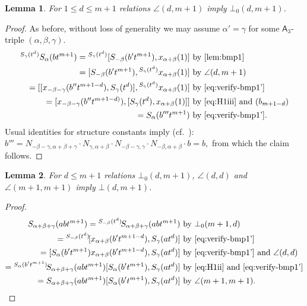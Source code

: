 \documentclass[oneside, 10pt]{amsart}
\numberwithin{equation}{section}
\newtheorem{lemma}{Lemma}
\numberwithin{lemma}{section}
\theoremstyle{definition}
\theoremstyle{remark}
\begin{document}
\begin{lemma} \label{claim2} For $1\leq d\leq m+1$ relations $\angle(d, m+1)$ imply $\bot_0(d, m+1)$. \end{lemma}
\begin{proof}
As before, without loss of generality we may assume $\alpha' = \gamma$ for some $\mathsf{A}_3$-triple $(\alpha, \beta, \gamma)$.
 \begin{align*}
 {}^{S_\gamma(t^d)}S_\alpha(bt^{m+1}) = {}^{S_\gamma(t^d)}[S_{-\beta}(b't^{m+1}), x_{\alpha+\beta}(1)] & \text{ by~\cref{lem:bmp1}}\\
 = [S_{-\beta}(b't^{m+1}), {}^{S_\gamma(t^d)}x_{\alpha+\beta}(1)]                                     
 & \text{ by $\angle(d, m+1)$}\\
 = [[x_{-\beta-\gamma}(b''t^{m+1-d}), S_\gamma(t^d)], {}^{S_\gamma(t^d)}x_{\alpha+\beta}(1)]          
 & \text{ by~\eqref{eq:verify-bmp1'}}\\
 = [x_{-\beta-\gamma}(b''t^{m+1-d)}), [S_\gamma(t^d), x_{\alpha+\beta}(1)]]                           
 & \text{ by~\eqref{eq:H1iii} and $(b_{m+1-d})$}\\
 = S_{\alpha}(b'''t^{m+1})                                                                            
 & \text{ by~\eqref{eq:verify-bmp1'}.} \end{align*}
Usual identities for structure constants imply (cf.~\cite[p.~12]{Re75}):
 $b'''=N_{-\beta-\gamma, \alpha+\beta+\gamma} \cdot N_{\gamma, \alpha+\beta} \cdot N_{-\beta-\gamma, \gamma} \cdot N_{-\beta, \alpha+\beta} \cdot b = b,$ from which the claim follows.
\end{proof}

\begin{lemma} \label{claim3}
 For $d\leq m+1$ relations $\bot_0(d, m+1)$, $\angle(d, d)$ and $\angle(m+1, m+1)$ imply $\bot(d, m+1)$.
\end{lemma}
\begin{proof}
 \begin{align*} 
 S_{\alpha+\beta+\gamma}(abt^{m+1}) = {}^{S_{-\beta}(t^d)}\!S_{\alpha+\beta+\gamma}(abt^{m+1}) 
 & \text{ by $\bot_0(m+1, d)$}\\
 = {}^{S_{-\beta}(t^d)}\![x_{\alpha+\beta}(b't^{m+1-d}), S_\gamma(at^d)] 
 & \text{ by~\eqref{eq:verify-bmp1'}} \\
 = [S_{\alpha}(b't^{m+1}) x_{\alpha+\beta}(b't^{m+1-d}), S_\gamma(at^d)] 
 & \text{ by~\eqref{eq:verify-bmp1'} and $\angle(d, d)$ }\\
 = {}^{S_{\alpha}(b't^{m+1})}\!S_{\alpha+\beta+\gamma}(abt^{m+1}) [S_{\alpha}(b't^{m+1}), S_\gamma(at^d)] 
 & \text{ by~\eqref{eq:H1ii} and~\eqref{eq:verify-bmp1'}} \\
 = S_{\alpha+\beta+\gamma}(abt^{m+1}) [S_{\alpha}(b't^{m+1}), S_\gamma(at^d)] 
 & \text{ by $\angle(m+1, m+1)$. \qedhere}
\end{align*}
\end{proof}
\end{document}

